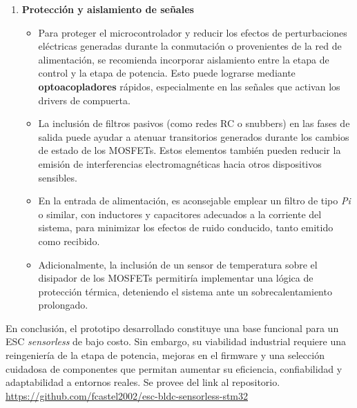 \begin{enumerate}[label=\textbf{\arabic*.}]
\item \textbf{Protección y aislamiento de señales}
  \begin{itemize}
    \item Para proteger el microcontrolador y reducir los efectos de perturbaciones eléctricas generadas durante la conmutación o provenientes de la red de alimentación, se recomienda incorporar aislamiento entre la etapa de control y la etapa de potencia. Esto puede lograrse mediante \textbf{optoacopladores} rápidos, especialmente en las señales que activan los drivers de compuerta.
    
    \item La inclusión de filtros pasivos (como redes RC o snubbers) en las fases de salida puede ayudar a atenuar transitorios generados durante los cambios de estado de los MOSFETs. Estos elementos también pueden reducir la emisión de interferencias electromagnéticas hacia otros dispositivos sensibles.

    \item En la entrada de alimentación, es aconsejable emplear un filtro de tipo \emph{Pi} o similar, con inductores y capacitores adecuados a la corriente del sistema, para minimizar los efectos de ruido conducido, tanto emitido como recibido. 
    \item Adicionalmente, la inclusión de un sensor de temperatura sobre el disipador de los MOSFETs permitiría implementar una lógica de protección térmica, deteniendo el sistema ante un sobrecalentamiento prolongado.
  \end{itemize}

\end{enumerate}

\bigskip

En conclusión, el prototipo desarrollado constituye una base funcional para un ESC \textit{sensorless} de bajo costo. Sin embargo, su viabilidad industrial requiere una reingeniería de la etapa de potencia, mejoras en el firmware y una selección cuidadosa de componentes que permitan aumentar su eficiencia, confiabilidad y adaptabilidad a entornos reales. Se provee del link al repositorio.
\url{https://github.com/fcastel2002/esc-bldc-sensorless-stm32}


\newpage
